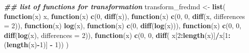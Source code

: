 \documentclass[
]{book}
\newenvironment{Shaded}{\begin{snugshade}}{\end{snugshade}}
\newcommand{\AttributeTok}[1]{\textcolor[rgb]{0.13,0.29,0.53}{#1}}
\newcommand{\ControlFlowTok}[1]{\textcolor[rgb]{0.13,0.29,0.53}{\textbf{#1}}}
\newcommand{\DecValTok}[1]{\textcolor[rgb]{0.00,0.00,0.81}{#1}}
\newcommand{\DocumentationTok}[1]{\textcolor[rgb]{0.56,0.35,0.01}{\textbf{\textit{#1}}}}
\newcommand{\FloatTok}[1]{\textcolor[rgb]{0.00,0.00,0.81}{#1}}
\newcommand{\FunctionTok}[1]{\textcolor[rgb]{0.13,0.29,0.53}{\textbf{#1}}}
\newcommand{\NormalTok}[1]{#1}
\newcommand{\OtherTok}[1]{\textcolor[rgb]{0.56,0.35,0.01}{#1}}
\newcommand{\SpecialCharTok}[1]{\textcolor[rgb]{0.81,0.36,0.00}{\textbf{#1}}}
\begin{document}
\begin{Shaded}
\begin{Highlighting}[]
\DocumentationTok{\#\# list of functions for transformation}
\NormalTok{transform\_fredmd }\OtherTok{\textless{}{-}} \FunctionTok{list}\NormalTok{(}
  \ControlFlowTok{function}\NormalTok{(x) x,}
  \ControlFlowTok{function}\NormalTok{(x) }\FunctionTok{c}\NormalTok{(}\DecValTok{0}\NormalTok{, }\FunctionTok{diff}\NormalTok{(x)),}
  \ControlFlowTok{function}\NormalTok{(x) }\FunctionTok{c}\NormalTok{(}\DecValTok{0}\NormalTok{, }\DecValTok{0}\NormalTok{, }\FunctionTok{diff}\NormalTok{(x, }\AttributeTok{differences =} \DecValTok{2}\NormalTok{)),}
  \ControlFlowTok{function}\NormalTok{(x) }\FunctionTok{log}\NormalTok{(x),}
  \ControlFlowTok{function}\NormalTok{(x) }\FunctionTok{c}\NormalTok{(}\DecValTok{0}\NormalTok{, }\FunctionTok{diff}\NormalTok{(}\FunctionTok{log}\NormalTok{(x))),}
  \ControlFlowTok{function}\NormalTok{(x) }\FunctionTok{c}\NormalTok{(}\DecValTok{0}\NormalTok{, }\DecValTok{0}\NormalTok{, }\FunctionTok{diff}\NormalTok{(}\FunctionTok{log}\NormalTok{(x), }\AttributeTok{differences =} \DecValTok{2}\NormalTok{)),}
  \ControlFlowTok{function}\NormalTok{(x) }\FunctionTok{c}\NormalTok{(}\DecValTok{0}\NormalTok{, }\DecValTok{0}\NormalTok{, }\FunctionTok{diff}\NormalTok{( x[}\DecValTok{2}\SpecialCharTok{:}\FunctionTok{length}\NormalTok{(x)]}\SpecialCharTok{/}\NormalTok{x[}\DecValTok{1}\SpecialCharTok{:}\NormalTok{(}\FunctionTok{length}\NormalTok{(x)}\SpecialCharTok{{-}}\DecValTok{1}\NormalTok{)] }\SpecialCharTok{{-}} \DecValTok{1}\NormalTok{))}
\NormalTok{)}
\end{Highlighting}
\end{Shaded}

\begin{Shaded}
\end{Shaded}
\end{document}
